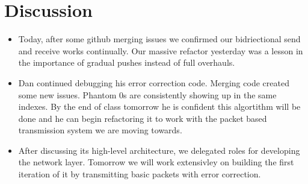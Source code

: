 \documentclass{article}
\begin{document}
\section*{Discussion}
\begin{itemize}
    \item Today, after some github merging issues we confirmed our bidriectional send and receive works continually. Our massive refactor
    yesterday was a lesson in the importance of gradual pushes instead of full overhauls. 
    \item Dan continued debugging his error correction code. Merging code created some new issues. Phantom 0s are consistently showing up in the same indexes. 
    By the end of class tomorrow he is confident this algortithm will be done and he can begin refactoring it to work with the packet based transmission system
    we are moving towards.
    \item After discussing its high-level architecture, we delegated roles for developing the network layer. Tomorrow we will work extensivley on building the
    first iteration of it by transmitting basic packets with error correction. 
\end{itemize}

\end{document}
